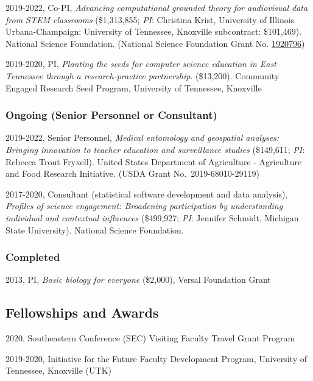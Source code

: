 \documentclass[14,]{article}
\begin{document}
2019-2022, Co-PI, \emph{Advancing computational grounded theory for
audiovisual data from STEM classrooms} (\$1,313,855; \emph{PI}:
Christina Krist, University of Illinois Urbana-Champaign; University of
Tennessee, Knoxville subcontract: \$101,469). National Science
Foundation. (National Science Foundation Grant No.
\href{https://www.nsf.gov/awardsearch/showAward?AWD_ID=1920796\&HistoricalAwards=false}{1920796})

2019-2020, PI, \emph{Planting the seeds for computer science education
in East Tennessee through a research-practice partnership}. (\$13,200).
Community Engaged Research Seed Program, University of Tennessee,
Knoxville

\hypertarget{ongoing-senior-personnel-or-consultant}{%
\subsubsection{Ongoing (Senior Personnel or
Consultant)}\label{ongoing-senior-personnel-or-consultant}}

2019-2022, Senior Personnel, \emph{Medical entomology and geospatial
analyses: Bringing innovation to teacher education and surveillance
studies} (\$149,611; \emph{PI}: Rebecca Trout Fryxell). United States
Department of Agriculture - Agriculture and Food Research Initiative.
(USDA Grant No.~2019-68010-29119)

2017-2020, Consultant (statistical software development and data
analysis), \emph{Profiles of science engagement: Broadening
participation by understanding individual and contextual influences}
(\$499,927; \emph{PI}: Jennifer Schmidt, Michigan State University).
National Science Foundation.

\hypertarget{completed}{%
\subsubsection{Completed}\label{completed}}

2013, PI, \emph{Basic biology for everyone} (\$2,000), Versal Foundation
Grant

\hypertarget{fellowships-and-awards}{%
\subsection{Fellowships and Awards}\label{fellowships-and-awards}}

2020, Southeastern Conference (SEC) Visiting Faculty Travel Grant
Program

2019-2020, Initiative for the Future Faculty Development Program,
University of Tennessee, Knoxville (UTK)
\end{document}

